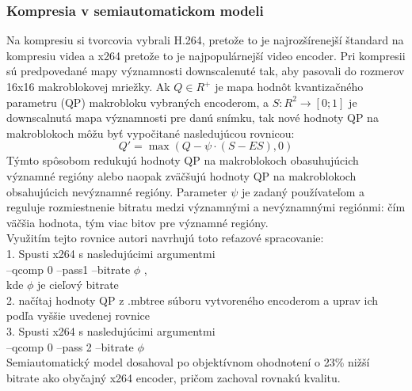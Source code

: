 \documentclass[10pt,twoside,slovak,a4paper]{article}
\begin{document}
\subsubsection{Kompresia v semiautomatickom modeli}
Na kompresiu si tvorcovia\cite{Coplien:MPD} vybrali H.264, pretože to je najrozšírenejší štandard na kompresiu videa a x264 pretože to je najpopulárnejší video encoder. Pri kompresii sú predpovedané mapy významnosti downscalenuté tak, aby pasovali do rozmerov 16x16 makroblokovej mriežky. Ak  \(Q \in R^+\) je mapa hodnôt kvantizačného parametru (QP) makrobloku vybraných encoderom, a \(S : R^2\rightarrow [0;1]\) je downscalnutá mapa významnosti pre danú snímku, tak nové hodnoty QP na makroblokoch môžu byť vypočitané nasledujúcou rovnicou:
\[{Q}' = \max(Q - \psi \cdot (S - ES),0)\]
Týmto spôsobom redukujú hodnoty QP na makroblokoch obasuhujúcich významné regióny alebo naopak zväčšujú hodnoty QP na makroblokoch obsahujúcich nevýznamné regióny. Parameter \(\psi\) je zadaný používateľom a reguluje rozmiestnenie bitratu medzi významnými a nevýznamnými regiónmi: čím väčšia hodnota, tým viac bitov pre významné regióny.\\
Využitím tejto rovnice autori\cite{Coplien:MPD} navrhujú toto reťazové spracovanie:\\
1. Spusti x264 s nasledujúcimi argumentmi\\
--qcomp 0 --pass1 --bitrate \( \phi\) ,\\
kde \( \phi\) je cieľový bitrate\\
2. načítaj hodnoty QP z .mbtree súboru vytvoreného encoderom a uprav ich podľa vyššie uvedenej rovnice \\
3. Spusti x264 s nasledujúcimi argumentmi\\
--qcomp 0 --pass 2 --bitrate \(\phi\)\\
Semiautomatický model dosahoval po objektívnom ohodnotení o 23\% nižší bitrate ako obyčajný x264 encoder, pričom zachoval rovnakú kvalitu.
\end{document}
